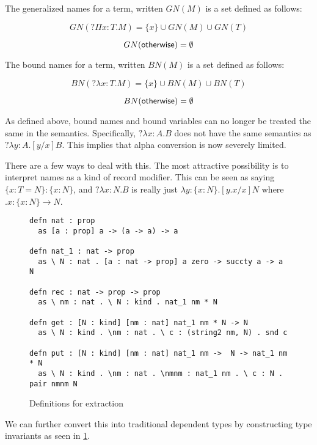 \begin{definition}
The generalized names for a term, written $GN(M)$ is a set defined as follows:

\[ 
GN(?\Pi x : T . M) = \{ x \} \cup GN(M) \cup GN(T)
\]

\[ 
GN(\mathsf{otherwise}) = \emptyset
\]

\end{definition}

\begin{definition}
The bound names for a term, written $BN(M)$ is a set defined as follows:

\[ 
BN(?\lambda x : T . M) = \{ x \} \cup BN(M) \cup BN(T)
\]

\[ 
BN(\mathsf{otherwise}) = \emptyset
\]

\end{definition}

As defined above, bound names and bound variables can no longer be treated the same in the semantics.  
Specifically, $?\lambda x : A . B$ does not have the same semantics as $?\lambda y : A . [y / x] B$.  
This implies that alpha conversion is now severely limited.  

There are a few ways to deal with this.  
The most attractive possibility is to interpret names as a kind of record modifier.
This can be seen as saying $\{ x : T = N \} : \{ x : N \}$, 
and $?\lambda x : N . B$ is really just $\lambda y : \{ x : N \} . [ y.x / x ] N$ where $ .x : \{ x : N \} \rightarrow N$.

\begin{figure}[H]
\begin{lstlisting}
defn nat : prop 
  as [a : prop] a -> (a -> a) -> a

defn nat_1 : nat -> prop
  as \ N : nat . [a : nat -> prop] a zero -> succty a -> a N

defn rec : nat -> prop -> prop
  as \ nm : nat . \ N : kind . nat_1 nm * N

defn get : [N : kind] [nm : nat] nat_1 nm * N -> N
  as \ N : kind . \nm : nat . \ c : (string2 nm, N) . snd c

defn put : [N : kind] [nm : nat] nat_1 nm ->  N -> nat_1 nm * N
  as \ N : kind . \nm : nat . \nmnm : nat_1 nm . \ c : N . pair nmnm N
\end{lstlisting}
\caption{Definitions for extraction}
\label{code:ideal}
\end{figure}

We can further convert this into traditional dependent types by constructing
 type invariants as seen in \ref{code:ideal}.

